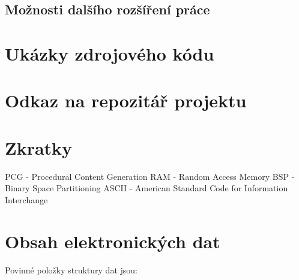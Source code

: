 \documentclass[
  program=itk,
  biblatex,
  figures=false,
  glossaries,
  index
]{kidiplom}
\begin{document}
\subsection{Možnosti dalšího rozšíření práce}

\begin{kiconclusions}
\end{kiconclusions}

\begin{kiconclusions}[english]
\end{kiconclusions}

\appendix

\section{Ukázky zdrojového kódu}

\section{Odkaz na repozitář projektu}

\section{Zkratky}
PCG - Procedural Content Generation
RAM - Random Access Memory
BSP - Binary Space Partitioning
ASCII - American Standard Code for Information Interchange

\section{Obsah elektronických dat} \label{sec:ObsahData}

Povinné položky struktury dat jsou:
\end{document}
